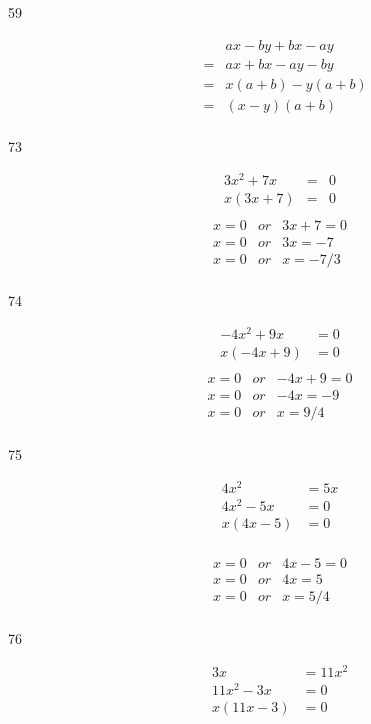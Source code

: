 \documentclass[fleqn,addpoints]{exam}
\begin{document}
\begin{description}
\item[59]
\begin{eqnarray*}
  &&  ax - by + bx - ay \\
  &=& ax + bx -ay - by \\
  &=& x(a + b) - y(a + b) \\
  &=& (x - y)(a + b) \\
\end{eqnarray*}

\item[73]
\begin{eqnarray*}
  3x^2 + 7x &=& 0 \\
  x(3x + 7) &=& 0 \\ 
\end{eqnarray*}
\begin{eqnarray*}
  x = 0 &or& 3x + 7 = 0 \\  
  x = 0 &or& 3x = -7 \\  
  x = 0 &or& x = -7/3 \\  
\end{eqnarray*}

\item[74]
\begin{align*}
  -4x^2 + 9x &= 0 \\
  x(-4x + 9) &= 0 \\
\end{align*}
\begin{eqnarray*}
  x = 0 &or& -4x + 9 = 0 \\
  x = 0 &or& -4x = -9 \\
  x = 0 &or& x = 9/4 \\
\end{eqnarray*}

\item[75]
\begin{align*}
  4x^2 &= 5x \\
  4x^2 - 5x &= 0 \\
  x(4x - 5) &= 0 \\
\end{align*}

\begin{eqnarray*}
  x = 0 &or& 4x - 5 = 0 \\
  x = 0 &or& 4x = 5 \\
  x = 0 &or& x = 5/4 \\
\end{eqnarray*}

\item[76]
\begin{align*}
3x &= 11x^2 \\
11x^2 - 3x &= 0 \\
x(11x - 3) &= 0 \\
\end{align*}


\end{description}
\end{document}
